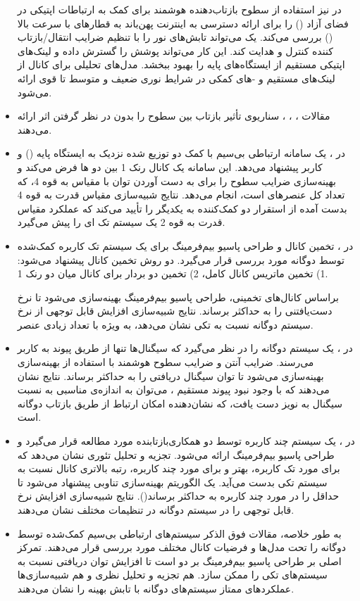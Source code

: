 \begin{itemize}
	در 
	\cite{7}
	نیز استفاده از سطوح بازتاب‌دهنده هوشمند برای کمک به ارتباطات اپتیکی در فضای آزاد () را برای ارائه دسترسی به اینترنت پهن‌باند به قطارهای با سرعت بالا () بررسی می‌کند.
	یک  می‌تواند تابش‌های نور را با تنظیم ضرایب انتقال/بازتاب کننده کنترل و هدایت کند. این کار می‌تواند پوشش را گسترش داده و لینک‌های اپتیکی مستقیم از ایستگاه‌های پایه را بهبود ببخشد. مدل‌های تحلیلی برای کانال از لینک‌های مستقیم و -های کمکی در شرایط نوری ضعیف و متوسط تا قوی ارائه می‌شود.
	\item 
	مقالات 
	\cite{8}، \cite{9}، \cite{10}، \cite{11} 
	سناریوی تأثیر بازتاب بین سطوح را بدون در نظر گرفتن اثر  ارائه می‌دهند.
	\item 
	در 
	\cite{8}
	، یک سامانه ارتباطی بی‌سیم با کمک دو  توزیع شده نزدیک به ایستگاه پایه () و کاربر پیشنهاد می‌دهد. این سامانه یک کانال  رنک 1 بین دو ‌ها فرض می‌کند و بهینه‌سازی ضرایب سطوح را برای به دست آوردن توان با مقیاس  به قوه 4، که  تعداد کل عنصر‌های  است، انجام می‌دهد. نتایج شبیه‌سازی مقیاس قدرت  به قوه 4 بدست آمده از استقرار دو  کمک‌کننده به یکدیگر را تأیید می‌کند که عملکرد مقیاس قدرت  به قوه 2 یک سیستم تک  ای را پیش می‌گیرد.
	\item 
	در 
	\cite{9}
	، تخمین کانال و طراحی پاسیو بیم‌فرمینگ برای یک سیستم تک کاربره کمک‌شده توسط  دوگانه مورد بررسی قرار می‌گیرد. دو روش تخمین کانال پیشنهاد می‌شود: 1) تخمین ماتریس کانال کامل، 2) تخمین دو بردار برای کانال میان دو  رنک 1. 
	
براساس کانال‌های تخمینی، طراحی پاسیو بیم‌فرمینگ بهینه‌سازی می‌شود تا نرخ دست‌یافتنی را به حداکثر برساند. نتایج شبیه‌سازی افزایش قابل توجهی از نرخ سیستم  دوگانه نسبت به  تکی نشان می‌دهد، به ویژه با تعداد زیادی عنصر.
	\item 
	در 
	\cite{10}
	، یک سیستم  دوگانه را در نظر می‌گیرد که سیگنال‌ها تنها از طریق پیوند  به کاربر می‌رسند. ضرایب آنتن و ضرایب سطوح هوشمند با استفاده از بهینه‌سازی  بهینه‌سازی می‌شود تا توان سیگنال دریافتی را به حداکثر برساند. نتایج نشان می‌دهند که با وجود نبود پیوند مستقیم ، می‌توان به اندازه‌ی مناسبی به نسبت سیگنال به نویز دست یافت، که نشان‌دهنده امکان ارتباط از طریق بازتاب دوگانه  است.
	\item 
	در 
	\cite{11}
	، یک سیستم  چند کاربره توسط دو  همکاری‌بازتابنده مورد مطالعه قرار می‌گیرد و طراحی پاسیو بیم‌فرمینگ ارائه می‌شود. تجزیه و تحلیل تئوری نشان می‌دهد که برای مورد تک کاربره،  بهتر و برای مورد چند کاربره، رتبه بالاتری کانال نسبت به سیستم  تکی بدست می‌آید. یک الگوریتم بهینه‌سازی تناوبی  پیشنهاد می‌شود تا حداقل  را در مورد چند کاربره به حداکثر برساند(). نتایج شبیه‌سازی افزایش نرخ قابل توجهی را در سیستم  دوگانه در تنظیمات مختلف نشان می‌دهند.
	\item 
	به طور خلاصه، مقالات فوق الذکر سیستم‌های ارتباطی بی‌سیم کمک‌شده توسط  دوگانه را تحت مدل‌ها و فرضیات کانال مختلف مورد بررسی قرار می‌دهند. تمرکز اصلی بر طراحی پاسیو بیم‌فرمینگ بر دو  است تا افزایش توان دریافتی نسبت به سیستم‌های  تکی را ممکن سازد. هم تجزیه و تحلیل نظری و هم شبیه‌سازی‌ها عملکردهای ممتاز سیستم‌های  دوگانه با تابش بهینه را نشان می‌دهند.
	

\end{itemize}

